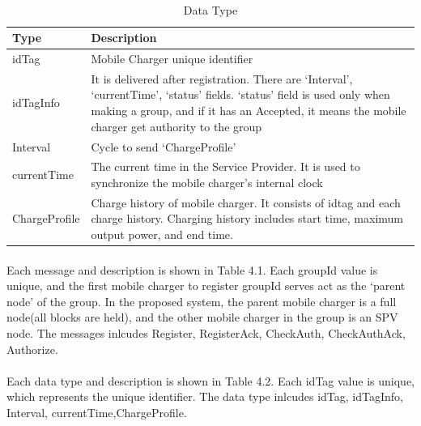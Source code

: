 \FloatBarrier
\begin{table}[h]
 \begin{center}
     \caption{ Data Type}

 
\paragraph{}

\begin{tabular}{ |p{3cm}|p{9cm}| }
\hline
\bf Type  & \bf Description  \\
\hline
idTag  & Mobile Charger unique identifier \\
\hline
idTagInfo  &  It is delivered after registration.
There are ‘Interval’, ‘currentTime’,
‘status’ fields. ‘status’ field is used only when
making a group, and if it has an
Accepted, it means the mobile
charger get authority to the group \\
\hline
Interval &  Cycle to send ‘ChargeProfile’ \\
\hline 
currentTime & The current time in the Service
Provider. It is used to synchronize the
mobile charger's internal clock \\
\hline
ChargeProfile & Charge history of mobile charger. It
consists of idtag and each charge
history. Charging history includes
start time, maximum output power,
and end time. \\
\hline
   \end{tabular}
   \end{center}
  \end{table}
\FloatBarrier

\paragraph{}Each message and description is shown in
Table 4.1. Each groupId value is unique, and the first mobile
charger to register groupId serves act as the ‘parent node’ of
the group. In the proposed system, the parent mobile charger is
a full node(all blocks are held), and the other mobile charger in
the group is an SPV node. The messages inlcudes Register, RegisterAck, CheckAuth, CheckAuthAck, Authorize. 

\paragraph{}Each data type and description is shown in
Table 4.2. Each idTag value is unique, which represents the unique identifier. The data type inlcudes idTag, idTagInfo, Interval, currentTime,ChargeProfile. 

